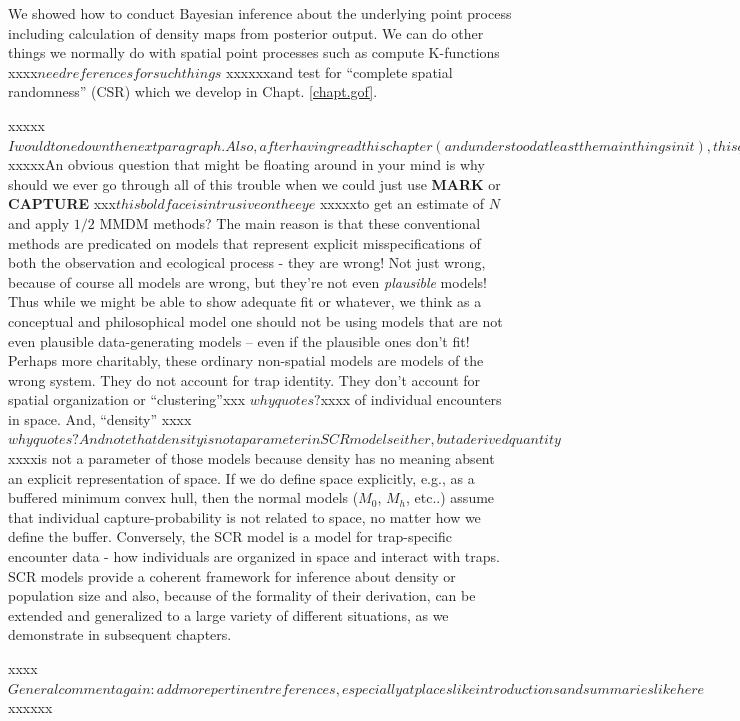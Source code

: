 {We showed how to conduct Bayesian inference about the underlying point process
including calculation of density maps from posterior output. We can do
other things we normally do with spatial point processes such as
compute K-functions xxxx$need references for such things$ xxxxxxand test for ``complete spatial randomness''
(CSR) which we develop in Chapt.  \ref{chapt.gof}. 


xxxxx$I would tone down the next paragraph. Also, after having read this chapter (and understood at least the main things in it), this question does not strike me as very obvious anymore$ xxxxxAn obvious question that might be floating around in your mind is why
should we ever go through all of this trouble when we could just use
{\bf MARK} or {\bf CAPTURE} xxx$this bold face is intrusive on the eye$ xxxxxto get an estimate of $N$ and apply $1/2$
MMDM methods?  The main reason is that these conventional methods are
predicated on models that represent explicit misspecifications of both
the observation and ecological process - they are wrong!  Not just
wrong, because of course all models are wrong, but they're not even
{\it plausible} models! Thus while we might be able to show adequate
fit or whatever, we think as a conceptual and philosophical model one
should not be using models that are not even plausible data-generating
models -- even if the plausible ones don't fit!  Perhaps more
charitably, these ordinary non-spatial models are models of the wrong
system. They do not account for trap identity. They don't account for
spatial organization or ``clustering''xxx $why quotes ?$xxxx of individual encounters in
space. And, ``density'' xxxx$why quotes ? And note that density is not a parameter in SCR models either, but a derived quantity$ xxxxis not a parameter of those models because
density has no meaning absent an explicit representation of space. If
we do define space explicitly, e.g., as a buffered minimum convex
hull, then the normal models ($M_{0}$, $M_{h}$, etc..) assume that
individual capture-probability is not related to space, no matter how
we define the buffer.  Conversely, the SCR model is a model for
trap-specific encounter data - how individuals are organized in space
and interact with traps. SCR models provide a coherent framework for
inference about density or population size and also, because of the
formality of their derivation, can be extended and generalized to a
large variety of different situations, as we demonstrate in subsequent
chapters.

xxxx$General comment again: add more pertinent references, especially at places like introductions and summaries like here$xxxxxx

}
